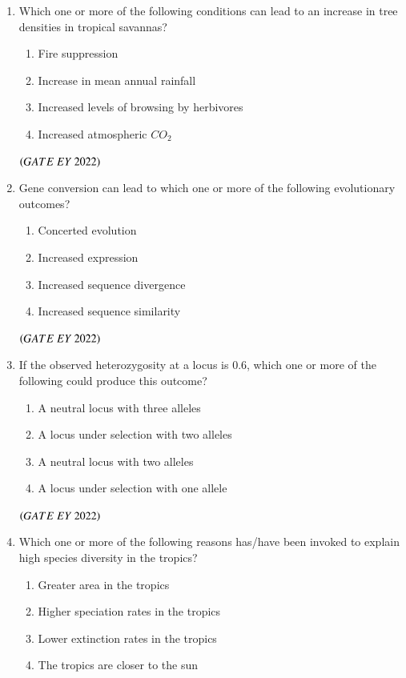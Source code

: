 \documentclass[journal]{IEEEtran}
\numberwithin{equation}{enumi}
\numberwithin{figure}{enumi}
\begin{document}
\begin{enumerate}
    \bigskip
 \item Which one or more of the following conditions can lead to an increase in tree densities
in tropical savannas?
    \begin{enumerate}
        \item  Fire suppression
        \item  Increase in mean annual rainfall
        \item  Increased levels of browsing by herbivores
        \item  Increased atmospheric $CO_2$
    \end{enumerate}
    \hfill{$\brak{ GATE\ EY\ 2022}$}
    \bigskip
 \item Gene conversion can lead to which one or more of the following evolutionary
outcomes?
    \begin{enumerate}
        \item  Concerted evolution
        \item  Increased expression
        \item  Increased sequence divergence
        \item  Increased sequence similarity
    \end{enumerate}
    \hfill{$\brak{ GATE\ EY\ 2022}$}
    \bigskip
 \item If the observed heterozygosity at a locus is $0.6$, which one or more of the following
could produce this outcome?
    \begin{enumerate}
        \item  A neutral locus with three alleles
        \item  A locus under selection with two alleles
        \item  A neutral locus with two alleles
        \item  A locus under selection with one allele
    \end{enumerate}
    \hfill{$\brak{ GATE\ EY\ 2022}$}
    \bigskip
 \item Which one or more of the following reasons has/have been invoked to explain high
species diversity in the tropics?
    \begin{enumerate}
        \item  Greater area in the tropics
        \item  Higher speciation rates in the tropics
        \item  Lower extinction rates in the tropics
        \item  The tropics are closer to the sun
    \end{enumerate}

\end{enumerate}
\end{document}
